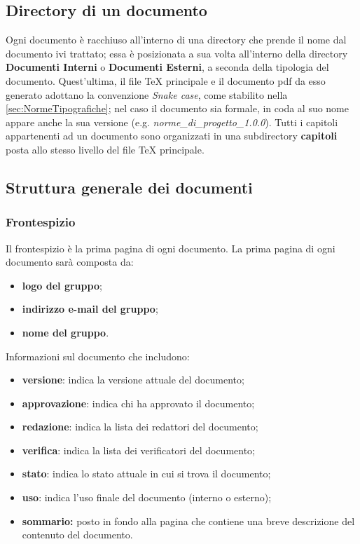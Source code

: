 \subsection{Directory di un documento}\label{ProcessiDiSupportoDocumentazioneDirectoryDiUnDocumento}
Ogni documento è racchiuso all'interno di una directory che prende il nome dal documento ivi trattato; essa è posizionata a sua volta all'interno della directory \textbf{Documenti Interni} o \textbf{Documenti Esterni}, a seconda della tipologia del documento. Quest'ultima, il file \TeX{} principale e il documento pdf da esso generato adottano la convenzione \textit{Snake case}, come stabilito nella \autoref{sec:NormeTipografiche}; nel caso il documento sia formale, in coda al suo nome appare anche la sua versione (e.g. \textit{norme\_di\_progetto\_1.0.0}).
Tutti i capitoli appartenenti ad un documento sono organizzati in una subdirectory \textbf{capitoli} posta allo stesso livello del file \TeX{} principale.
\subsection{Struttura generale dei documenti}\label{ProcessiDiSupportoDocumentazioneStrutturaGeneraleDeiDocumenti}
\subsubsection{Frontespizio}\label{ProcessiDiSupportoDocumentazioneStrutturaGeneraleDeiDocumentiFrontespizio}
Il frontespizio è la prima pagina di ogni documento.
La prima pagina di ogni documento sarà composta da:
\begin{itemize}
	\item \textbf{logo del gruppo};
		\item \textbf{indirizzo e-mail del gruppo};
			\item \textbf{nome del gruppo}.
\end{itemize}
Informazioni sul documento che includono:
\begin{itemize}
	\item \textbf{versione}: indica la versione attuale del documento;
		\item \textbf{approvazione}: indica chi ha approvato il documento;
			\item \textbf{redazione}: indica la lista dei redattori del documento;
				\item \textbf{verifica}: indica la lista dei verificatori del documento;
					\item \textbf{stato}: indica lo stato attuale in cui si trova il documento;
						\item \textbf{uso}: indica l’uso finale del documento (interno o esterno);
							\item \textbf{sommario:} posto in fondo alla pagina che contiene una breve descrizione del contenuto del documento.
\end{itemize}
